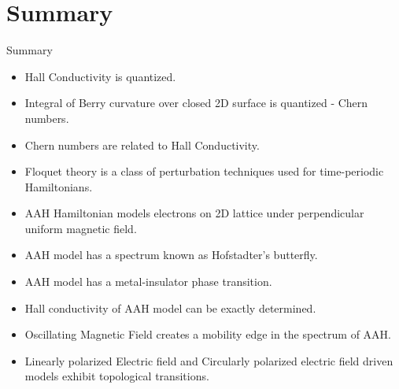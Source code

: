 \documentclass{beamer}
\begin{document}
\section*{Summary}

\begin{frame}{Summary}
  \begin{itemize}\small
  \item
    Hall Conductivity is \alert{quantized}.
  \item
    Integral of Berry curvature over closed 2D surface is quantized - \alert{Chern numbers}.
  \item
    Chern numbers are related to Hall Conductivity.
  \item
    Floquet theory is a class of perturbation techniques used for time-periodic Hamiltonians.
  \item
    AAH Hamiltonian models electrons on 2D lattice under perpendicular uniform magnetic field.
  \item
    AAH model has a spectrum known as \alert{Hofstadter's butterfly}.
  \item
    AAH model has a metal-insulator phase transition.
  \item
    Hall conductivity of AAH model can be exactly determined.
  \item
    Oscillating Magnetic Field creates a mobility edge in the spectrum of AAH.
  \item
    Linearly polarized Electric field and Circularly polarized electric field driven models exhibit topological transitions.
  \end{itemize}  \normalsize
\end{frame}
\end{document}
